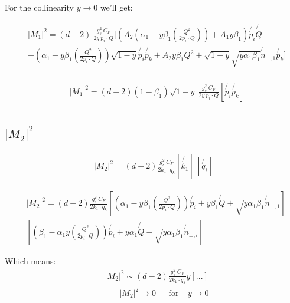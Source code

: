 For the collinearity $ y \rightarrow 0 $ we'll get:

\begin{equation}
\begin{split}
&|M_1|^2=(d-2)\:\frac{g_s^2 \: C_F }{2y\: p_i \cdot Q}
[(A_2(\alpha_1 -y\beta_1(\frac{Q^2}{2p_i \cdot Q}))+ A_1y\beta_1) \not{p_i} \not{Q}\\
&+(\alpha_1 -y\beta_1(\frac{Q^2}{2p_i \cdot Q}))\sqrt{1-y}\not{p_i} \not{p_k}+A_2 y\beta_1 Q^2+ \sqrt{1-y}\sqrt{y\alpha_1\beta_1}\not{n}_{\bot,1} \not{p_k} ]\\
\end{split}
\end{equation}

\begin{equation}
\begin{split}
&|M_1|^2=(d-2)(1-\beta_1)\sqrt{1-y}\:\frac{g_s^2 \: C_F }{2y\: p_i \cdot Q}
[\not{p_i} \not{p_k} ]\\
\end{split}
\end{equation}

\subsection*{$ |M_2|^2 $}

\begin{equation}
\begin{split}
|M_2|^2 =(d-2) \frac{g_s^2 \: C_F }{2k_1 \cdot q_k} [\not{k_1}]\: 
[\not{q_i} ]
\end{split}
\end{equation}

\begin{equation}
\begin{split}
&|M_2|^2 =(d-2) \frac{g_s^2 \: C_F}{2k_1 \cdot q_k} [(\alpha_1 -y\beta_1(\frac{Q^2}{2p_i \cdot Q})) \not{p_i} + y\beta_1\not{Q} + \sqrt{y\alpha_1\beta_1}\not{n}_{\bot,1}]\: \\
&[(\beta_1 -\alpha_1 y(\frac{Q^2}{2p_i \cdot Q}))\not{p_i} + y\alpha_1\not{Q} - \sqrt{y\alpha_1\beta_1}\not{n}_{\bot,l} ]
\end{split}
\end{equation}

Which means:
\begin{equation}
\begin{split}
&|M_2|^2 \sim(d-2) \frac{g_s^2 \: C_F}{2k_1 \cdot q_k} y[...]\\
&\:\:\:\:\:\:\:\:|M_2|^2\rightarrow 0 \:\:\:\:\:\:\:\text{for}\:\:\:\:\: y\rightarrow 0
\end{split}
\end{equation}

